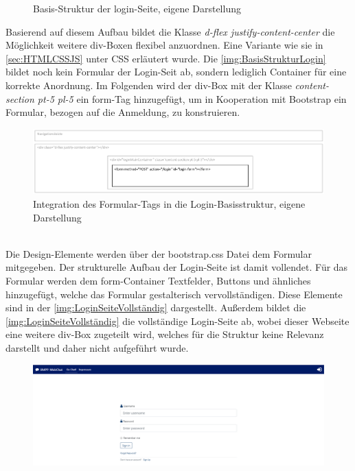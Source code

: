 \documentclass[a4paper,titlepage,halfparskip,12pt]{scrreprt}
\begin{document}
\begin{onehalfspacing}
\begin{figure}[h]
	\caption{Basis-Struktur der login-Seite, eigene Darstellung}
	\label{img:BasisStrukturLogin}
\end{figure}
Basierend auf diesem Aufbau bildet die Klasse \textit{d-flex justify-content-center} die Möglichkeit weitere div-Boxen flexibel anzuordnen. Eine Variante wie sie in \autoref{sec:HTMLCSSJS} unter \ac{CSS} erläutert wurde. Die \autoref{img:BasisStrukturLogin} bildet noch kein Formular der Login-Seit ab, sondern lediglich Container für eine korrekte Anordnung. Im Folgenden wird der div-Box mit der Klasse \textit{content-section pt-5 pl-5} ein form-Tag hinzugefügt, um in Kooperation mit Bootstrap ein Formular, bezogen auf die Anmeldung, zu konstruieren.
\begin{figure}[h]
	\centering
	\includegraphics[scale=0.55]{images/loginBasisStruktur&FormContainer}
	\caption{Integration des Formular-Tags in die Login-Basisstruktur, eigene Darstellung}
	\label{img:BasisStrukturLoginUnd Formular}
\end{figure}\\
Die Design-Elemente werden über der bootstrap.css Datei dem Formular mitgegeben. Der strukturelle Aufbau der Login-Seite ist damit vollendet. Für das Formular werden dem form-Container Textfelder, Buttons und ähnliches hinzugefügt, welche das Formular gestalterisch vervollständigen. Diese Elemente sind in der \autoref{img:LoginSeiteVollständig} dargestellt. Außerdem bildet die \autoref{img:LoginSeiteVollständig} die vollständige Login-Seite ab, wobei dieser Webseite eine weitere div-Box zugeteilt wird, welches für die Struktur keine Relevanz darstellt und daher nicht aufgeführt wurde.
\begin{figure}[h]
	\centering
	\includegraphics[width=\linewidth]{images/loginSeiteFertig}

\end{figure}
\end{onehalfspacing}
\end{document}
